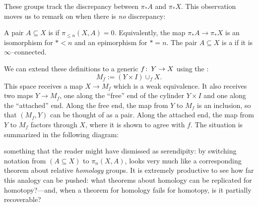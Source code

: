 
These groups track the discrepancy between $\pi_* A$ and $\pi_* X$.
This observation moves us to remark on when there is \emph{no} discrepancy:

\begin{definition}\label{ConnectedDefn}%
A pair $A \subseteq X$ is  if $\pi_{\le n}(X, A) = 0$.
Equivalently, the map $\pi_* A \to \pi_* X$ is an isomorphism for $* < n$ and an epimorphism for $* = n$.
The pair $A \subseteq X$ is a  if it is $\infty$--connected.
\end{definition}

\begin{remark}
We can extend these definitions to a generic $f\colon\thinspace Y \to X$ using the : \[M_f := (Y \times I) \cup_f X.\]
This space receives a map $X \to M_f$ which is a weak equivalence.
It also receives two maps $Y \to M_f$, one along the ``free'' end of the cylinder $Y \times I$ and one along the ``attached'' end.
Along the free end, the map from $Y$ to $M_f$ is an inclusion, so that $(M_f, Y)$ can be thought of as a pair.
Along the attached end, the map from $Y$ to $M_f$ factors through $X$, where it is shown to agree with $f$.
The situation is summarized in the following diagram:
\begin{center}
\end{center}
\end{remark}

 something that the reader might have dismissed as serendipity: by switching notation from $(A \subseteq X)$ to $\pi_n(X, A)$,  looks very much like a corresponding theorem about relative \emph{homology} groups.
It is extremely productive to see how far this analogy can be pushed: what theorems about homology can be replicated for homotopy?---and, when a theorem for homology fails for homotopy, is it partially recoverable?

